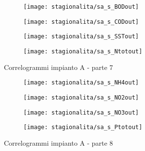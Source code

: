 \begin{sidewaysfigure}[h]\ContinuedFloat
	\renewcommand*\thesubfigure{(\arabic{subfigure})}
	\begin{subfigure}{0.49\textwidth}
		\texttt{[image: stagionalita/sa\_s\_BODout]}
		\caption{}
		\centering
	\end{subfigure}
	\begin{subfigure}{0.49\textwidth}
		\texttt{[image: stagionalita/sa\_s\_CODout]}
		\caption{}
		\centering
	\end{subfigure}

	\begin{subfigure}{0.49\textwidth}
		\texttt{[image: stagionalita/sa\_s\_SSTout]}
		\caption{}
		\centering
	\end{subfigure}
	\begin{subfigure}{0.49\textwidth}
		\texttt{[image: stagionalita/sa\_s\_Ntotout]}	
		\caption{}
		\centering
	\end{subfigure}
	\caption{Correlogrammi impianto A - parte 7}
\end{sidewaysfigure}

\begin{sidewaysfigure}[h]\ContinuedFloat
	\renewcommand*\thesubfigure{(\arabic{subfigure})}
	\begin{subfigure}{0.49\textwidth}
		\texttt{[image: stagionalita/sa\_s\_NH4out]}
		\caption{}
		\centering
	\end{subfigure}
	\begin{subfigure}{0.49\textwidth}
		\texttt{[image: stagionalita/sa\_s\_NO2out]}
		\caption{}
		\centering
	\end{subfigure}

	\begin{subfigure}{0.49\textwidth}
		\texttt{[image: stagionalita/sa\_s\_NO3out]}
		\caption{}
		\label{fig:sa_s_NO3out}
		\centering
	\end{subfigure}
	\begin{subfigure}{0.49\textwidth}
		\texttt{[image: stagionalita/sa\_s\_Ptotout]}	
		\caption{}
		\label{fig:sa_s_Ptotout}
		\centering
	\end{subfigure}
	\caption{Correlogrammi impianto A - parte 8}
\end{sidewaysfigure}

